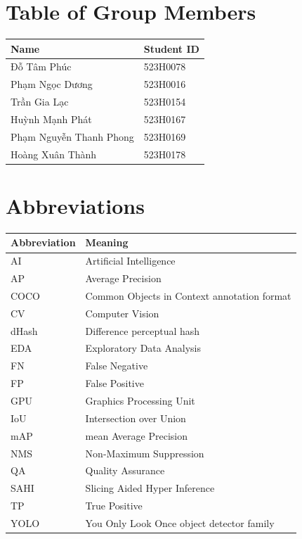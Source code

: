 \documentclass[12pt,a4paper]{report}
\begin{document}
\chapter*{Table of Group Members}
\begin{center}
\begin{tabular}{ll}
\toprule
\textbf{Name} & \textbf{Student ID} \\
\midrule
Đỗ Tâm Phúc & 523H0078 \\
Phạm Ngọc Dương & 523H0016 \\
Trần Gia Lạc & 523H0154 \\
Huỳnh Mạnh Phát & 523H0167 \\
Phạm Nguyễn Thanh Phong & 523H0169 \\
Hoàng Xuân Thành & 523H0178 \\
\bottomrule
\end{tabular}
\end{center}

\tableofcontents
\listoffigures
\listoftables

\chapter*{Abbreviations}
\begin{center}
\begin{tabular}{ll}
\toprule
\textbf{Abbreviation} & \textbf{Meaning} \\
\midrule
AI & Artificial Intelligence \\
AP & Average Precision \\
COCO & Common Objects in Context annotation format \\
CV & Computer Vision \\
dHash & Difference perceptual hash \\
EDA & Exploratory Data Analysis \\
FN & False Negative \\
FP & False Positive \\
GPU & Graphics Processing Unit \\
IoU & Intersection over Union \\
mAP & mean Average Precision \\
NMS & Non-Maximum Suppression \\
QA & Quality Assurance \\
SAHI & Slicing Aided Hyper Inference \\
TP & True Positive \\
YOLO & You Only Look Once object detector family \\
\bottomrule
\end{tabular}
\end{center}
\end{document}
